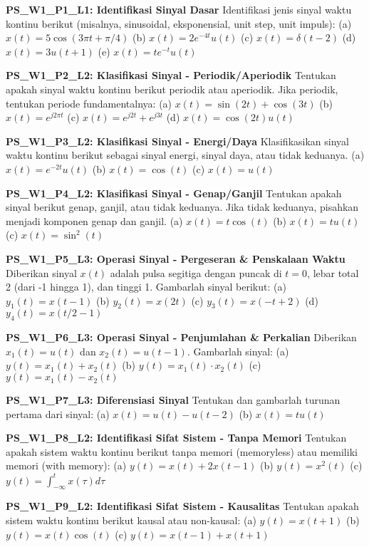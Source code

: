 \documentclass[
  letterpaper,
  DIV=11,
  numbers=noendperiod]{scrreprt}
\begin{document}
\textbf{PS\_W1\_P1\_L1: Identifikasi Sinyal Dasar} Identifikasi jenis
sinyal waktu kontinu berikut (misalnya, sinusoidal, eksponensial, unit
step, unit impuls): (a) \(x(t) = 5 \cos(3\pi t + \pi/4)\) (b)
\(x(t) = 2e^{-4t} u(t)\) (c) \(x(t) = \delta(t-2)\) (d)
\(x(t) = 3u(t+1)\) (e) \(x(t) = t e^{-t} u(t)\)

\textbf{PS\_W1\_P2\_L2: Klasifikasi Sinyal - Periodik/Aperiodik}
Tentukan apakah sinyal waktu kontinu berikut periodik atau aperiodik.
Jika periodik, tentukan periode fundamentalnya: (a)
\(x(t) = \sin(2t) + \cos(3t)\) (b) \(x(t) = e^{j2\pi t}\) (c)
\(x(t) = e^{j2t} + e^{j3t}\) (d) \(x(t) = \cos(2t) u(t)\)

\textbf{PS\_W1\_P3\_L2: Klasifikasi Sinyal - Energi/Daya} Klasifikasikan
sinyal waktu kontinu berikut sebagai sinyal energi, sinyal daya, atau
tidak keduanya. (a) \(x(t) = e^{-2t} u(t)\) (b) \(x(t) = \cos(t)\) (c)
\(x(t) = u(t)\)

\textbf{PS\_W1\_P4\_L2: Klasifikasi Sinyal - Genap/Ganjil} Tentukan
apakah sinyal berikut genap, ganjil, atau tidak keduanya. Jika tidak
keduanya, pisahkan menjadi komponen genap dan ganjil. (a)
\(x(t) = t \cos(t)\) (b) \(x(t) = t u(t)\) (c) \(x(t) = \sin^2(t)\)

\textbf{PS\_W1\_P5\_L3: Operasi Sinyal - Pergeseran \& Penskalaan Waktu}
Diberikan sinyal \(x(t)\) adalah pulsa segitiga dengan puncak di
\(t=0\), lebar total 2 (dari -1 hingga 1), dan tinggi 1. Gambarlah
sinyal berikut: (a) \(y_1(t) = x(t-1)\) (b) \(y_2(t) = x(2t)\) (c)
\(y_3(t) = x(-t+2)\) (d) \(y_4(t) = x(t/2 - 1)\)

\textbf{PS\_W1\_P6\_L3: Operasi Sinyal - Penjumlahan \& Perkalian}
Diberikan \(x_1(t) = u(t)\) dan \(x_2(t) = u(t-1)\). Gambarlah sinyal:
(a) \(y(t) = x_1(t) + x_2(t)\) (b) \(y(t) = x_1(t) \cdot x_2(t)\) (c)
\(y(t) = x_1(t) - x_2(t)\)

\textbf{PS\_W1\_P7\_L3: Diferensiasi Sinyal} Tentukan dan gambarlah
turunan pertama dari sinyal: (a) \(x(t) = u(t) - u(t-2)\) (b)
\(x(t) = t u(t)\)

\textbf{PS\_W1\_P8\_L2: Identifikasi Sifat Sistem - Tanpa Memori}
Tentukan apakah sistem waktu kontinu berikut tanpa memori (memoryless)
atau memiliki memori (with memory): (a) \(y(t) = x(t) + 2x(t-1)\) (b)
\(y(t) = x^2(t)\) (c) \(y(t) = \int_{-\infty}^{t} x(\tau) d\tau\)

\textbf{PS\_W1\_P9\_L2: Identifikasi Sifat Sistem - Kausalitas} Tentukan
apakah sistem waktu kontinu berikut kausal atau non-kausal: (a)
\(y(t) = x(t+1)\) (b) \(y(t) = x(t) \cos(t)\) (c)
\(y(t) = x(t-1) + x(t+1)\)
\end{document}
